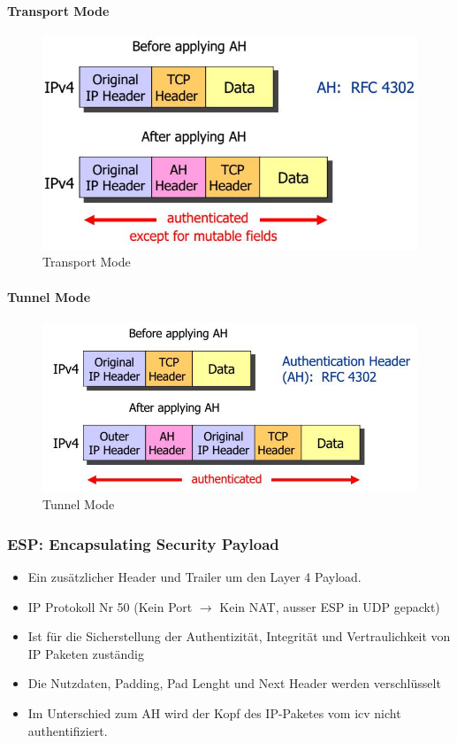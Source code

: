\paragraph{Transport Mode} \hfill
\begin{figure}[h]
\centering
\includegraphics[width=0.5\linewidth]{images/ipsec_ah_header}
\caption{Transport Mode}
\label{fig:ipsecahheader}
\end{figure}

\paragraph{Tunnel Mode} \hfill
\begin{figure}[h!]
	\centering
	\includegraphics[width=0.7\linewidth]{images/ipsec_ah_transport}
	\caption{Tunnel Mode}
	\label{fig:ipsecahtransport}
\end{figure}


\subsubsection{ESP: Encapsulating Security Payload}
\begin{itemize}
	\item Ein zusätzlicher Header und Trailer um den Layer 4 Payload.
	\item IP Protokoll Nr 50 (Kein Port $\rightarrow$ Kein NAT, ausser ESP in UDP gepackt)
	\item Ist für die Sicherstellung der Authentizität, Integrität und Vertraulichkeit von IP Paketen zuständig
	\item Die Nutzdaten, Padding, Pad Lenght und Next Header werden verschlüsselt
	\item Im Unterschied zum AH wird der Kopf des IP-Paketes vom \gls{icv} nicht authentifiziert.
\end{itemize}
